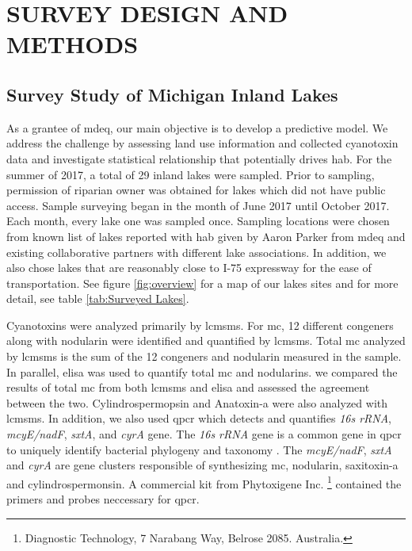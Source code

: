 \chapter{SURVEY DESIGN AND METHODS}

\section{Survey Study of Michigan Inland Lakes} 
As a grantee of \gls{mdeq}, our main objective is to develop a predictive model. We address the challenge by assessing land use information and collected cyanotoxin data and investigate statistical relationship that potentially drives \gls{hab}. For the summer of 2017, a total of 29 inland lakes were sampled. Prior to sampling, permission of riparian owner was obtained for lakes which did not have public access. Sample surveying began in the month of June 2017 until October 2017. Each month, every lake one was sampled once. Sampling locations were chosen from known list of lakes reported with \gls{hab} given by Aaron Parker from \gls{mdeq} and existing collaborative partners with different lake associations. In addition, we also chose lakes that are reasonably close to I-75 expressway for the ease of transportation. See figure \ref{fig:overview} for a map of our lakes sites and for more detail, see table \ref{tab:Surveyed Lakes}.

Cyanotoxins were analyzed primarily by \gls{lcmsms}. For \gls{mc}, 12 different congeners along with nodularin were identified and quantified by \gls{lcmsms}. Total \gls{mc} analyzed by \gls{lcmsms} is the sum of the 12 congeners and nodularin measured in the sample. In parallel, \gls{elisa} was used to quantify total \gls{mc} and nodularins.  we compared the results of total \gls{mc} from both \gls{lcmsms} and \gls{elisa} and assessed the agreement between the two. Cylindrospermopsin and Anatoxin-a were also analyzed with \gls{lcmsms}. In addition, we also used \gls{qpcr} which detects and quantifies \emph{16s rRNA}, \emph{mcyE/nadF}, \emph{sxtA}, and \emph{cyrA} gene. The \emph{16s rRNA} gene is a common gene in \gls{qpcr} to uniquely identify bacterial phylogeny and taxonomy \cite{janda_16s_2007}.  The \emph{mcyE/nadF}, \emph{sxtA} and \emph{cyrA} are gene clusters responsible of synthesizing \gls{mc}, nodularin, saxitoxin-a and cylindrospermonsin. A commercial kit from Phytoxigene Inc. \footnote{Diagnostic Technology, 7 Narabang Way, Belrose 2085. Australia.} contained the primers and probes neccessary for \gls{qpcr}.  

